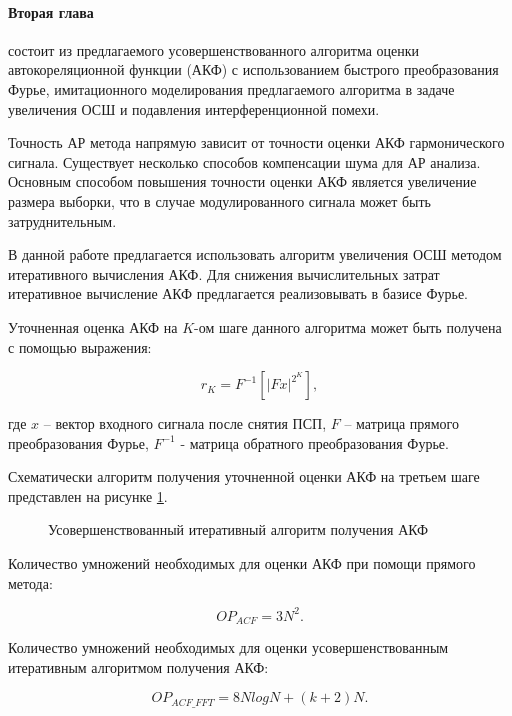 \paragraph{Вторая глава} состоит из предлагаемого усовершенствованного алгоритма оценки автокореляционной функции (АКФ) с использованием
быстрого преобразования Фурье, имитационного моделирования предлагаемого алгоритма в задаче увеличения ОСШ и подавления 
интерференционной помехи.

Точность АР метода напрямую зависит от точности оценки АКФ гармонического сигнала.
Существует несколько способов компенсации шума для АР анализа.
Основным способом повышения точности оценки АКФ является увеличение размера выборки, что в случае модулированного сигнала может быть затруднительным. 

В данной работе предлагается использовать алгоритм увеличения ОСШ методом итеративного вычисления АКФ.
Для снижения вычислительных затрат итеративное вычисление АКФ предлагается реализовывать в базисе Фурье. 

Уточненная оценка АКФ на ${K}$-ом шаге данного алгоритма может быть получена с помощью выражения:
\begin{center}
\begin{equation}
	\label{eq:akf_3}
	\hat{r}_K = F^{-1}\left[ \left| Fx \right| ^{2^K} \right],
\end{equation}
\end{center}
где ${x}$ – вектор входного сигнала после снятия ПСП, ${F}$ – матрица прямого преобразования Фурье,
${F^{-1}}$ - матрица обратного преобразования Фурье.

Схематически алгоритм получения уточненной оценки АКФ на третьем шаге представлен на рисунке \ref{pic:akf_pic}.
\begin{figure}[h]
	\center{}
	\caption{Усовершенствованный итеративный алгоритм получения АКФ}
	\label{pic:akf_pic}
\end{figure}

Количество умножений необходимых для оценки АКФ при помощи прямого метода:
\begin{center}
\begin{equation}
	OP_{ACF} = 3N^2.
\end{equation}
\end{center}

Количество умножений необходимых для оценки усовершенствованным итеративным алгоритмом получения АКФ: \begin{center}
\begin{equation}
	OP_{ACF\_FFT} = 8NlogN + (k+2)N.
\end{equation}
\end{center}

